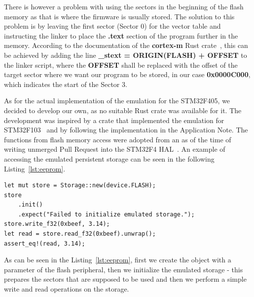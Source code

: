 There is however a problem with using the sectors in the beginning of the flash memory as that is where the firmware is usually stored.
The solution to this problem is by leaving the first sector (Sector 0) for the vector table and instructing the linker to place the \textbf{.text} section of the program further in the memory.
According to the documentation of the \textbf{cortex-m} Rust crate~\cite{crate-cortext-m}, this can be achieved by adding the line \textbf{\_stext = ORIGIN(FLASH) + OFFSET} to the linker script, where the \textbf{OFFSET} shall be replaced with the offset of the target sector where we want our program to be stored, in our case \textbf{0x0000C000}, which indicates the start of the Sector 3.

As for the actual implementation of the emulation for the STM32F405, we decided to develop our own, as no suitable Rust crate was available for it.
The development was inspired by a crate that implemented the emulation for STM32F103~\cite{crate_f103_eeprom} and by following the implementation in the Application Note.
The functions from flash memory access were adopted from an as of the time of writing unmerged Pull Request into the STM32F4 HAL~\cite{pr_flash}.
An example of accessing the emulated persistent storage can be seen in the following Listing~\ref{lst:eeprom}.

\begin{lstlisting}[caption={An example use of the emulated persistent storage.},label=lst:eeprom]
let mut store = Storage::new(device.FLASH);
store
    .init()
    .expect("Failed to initialize emulated storage.");
store.write_f32(0xbeef, 3.14);
let read = store.read_f32(0xbeef).unwrap();
assert_eq!(read, 3.14);
\end{lstlisting}

As can be seen in the Listing~\ref{lst:eeprom}, first we create the object with a parameter of the flash peripheral, then we initialize the emulated storage - this prepares the sectors that are supposed to be used and then we perform a simple write and read operations on the storage.

